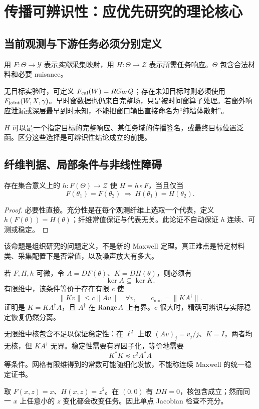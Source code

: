 \section{传播可辨识性：应优先研究的理论核心}
\subsection{当前观测与下游任务必须分别定义}
用 $F:\Theta\to\mathcal Y$ 表示\emph{实际}采集映射，用 $H:\Theta\to\mathcal Z$ 表示所需任务响应。$\Theta$ 包含合法材料和必要 nuisance。

无目标实验时，可定义 $F_{\rm cal}(W)=R G_WQ$；存在未知目标时则必须使用 $F_{\rm joint}(W,X,\gamma)$。早时窗数据也仍来自完整场，只是被时间窗算子处理。若窗外响应泄漏或深层最早到时未知，不能把窗口输出直接命名为“纯墙体散射”。

$H$ 可以是一个指定目标的完整响应、某任务域的传播签名，或最终目标位置泛函。区分这些选择是可辨识性结论成立的前提。

\subsection{纤维判据、局部条件与非线性障碍}
\begin{proposition}
存在集合意义上的 $h:F(\Theta)\to\mathcal Z$ 使 $H=h\circ F$，当且仅当
\[
F(\theta_1)=F(\theta_2)\ \Longrightarrow\
H(\theta_1)=H(\theta_2).
\]
\end{proposition}
\begin{proof}
必要性直接。充分性是在每个观测纤维上选取一个代表，定义 $h(F(\theta))=H(\theta)$；纤维常值保证与代表无关。此论证不自动保证 $h$ 连续、可测或稳定。
\end{proof}
该命题是组织研究的问题定义，不是新的 Maxwell 定理。真正难点是特定材料类、采集配置下是否常值，以及噪声放大有多大。

若 $F,H,h$ 可微，令 $A=DF(\theta)$、$K=DH(\theta)$，则必须有
\[
\ker A\subseteq\ker K.
\]
有限维中，该条件等价于存在有限 $c$ 使
\[
\|Kv\|\le c\|Av\|\quad\forall v,\qquad
c_{\min}=\|KA^\dagger\|.
\]
证明是 $K=KA^\dagger A$，且 $A^\dagger$ 在 $\operatorname{Range} A$ 上有界。$c$ 很大时，精确可辨识与实际稳定恢复仍然分离。

无限维中核包含不足以保证稳定性：在 $\ell^2$ 上取 $(Av)_j=v_j/j$、$K=I$，两者均无核，但 $K A^\dagger$ 无界。稳定性需要有界因子化，等价地需要
\[
K^*K\preceq c^2 A^*A
\]
等条件。网格有限维得到的常数可能随细化发散，不能称连续 Maxwell 的统一稳定证书。

\begin{example}[一阶条件不能替代非线性任务可辨识]
取 $F(x,z)=x$、$H(x,z)=z^2$。在 $(0,0)$ 有 $DH=0$，核包含成立；然而同一 $x$ 上任意小的 $z$ 变化都会改变任务。因此单点 Jacobian 检查不充分。
\end{example}

